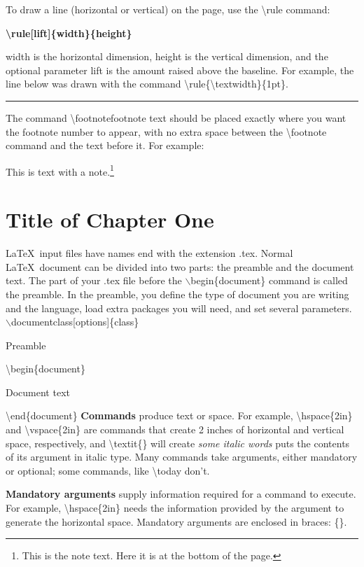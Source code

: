 \documentclass[a4paper,11pt,UTF8,openright]{book}
\begin{document}
To draw a line (horizontal or vertical) on the page, use the \textbackslash rule command:

\textbf{\textbackslash rule[lift]\{width\}\{height\}}

width is the horizontal dimension, height is the vertical dimension, and the optional
parameter lift is the amount raised above the baseline. For example, the line below was
drawn with the command \textbackslash rule\{\textbackslash textwidth\}\{1pt\}.

\rule{\textwidth}{1pt}

The command \textbackslash footnote{footnote text} should be placed exactly where you want the footnote number to appear, with no extra space between the \textbackslash footnote command and the text before it. For example: 

This is text with a note.\footnote{This is the note text. Here it is at the bottom of the page.}



\mainmatter
\chapter{Title of Chapter One}

\LaTeX\ input files have names end with the extension .tex. Normal \LaTeX\ document can be divided into two parts: the preamble and the document text. The part of your .tex file before the $\backslash$begin\{document\} command is called the preamble. In the preamble, you define the type of document you are writing and the language, load extra packages you will need, and set several parameters. 
\vskip 0.2in
$\backslash$documentclass[options]\{class\}

Preamble

\textbackslash begin\{document\}

Document text
	
\textbackslash end\{document\}
\vskip 0.2in
\textbf{Commands} produce text or space. For example, \textbackslash hspace\{2in\} and \textbackslash vspace\{2in\} are commands that create 2 inches of horizontal and vertical space, respectively, and \textbackslash textit\{\} will create \textit{some italic words} puts the contents of its argument in italic type. Many commands take arguments, either mandatory or optional; some commands, like \textbackslash today don’t.

\textbf{Mandatory arguments} supply information required for a command to execute. For
example, \textbackslash hspace\{2in\} needs the information provided by the argument to generate the horizontal space. Mandatory arguments are enclosed in braces: \{\}.
\end{document}
